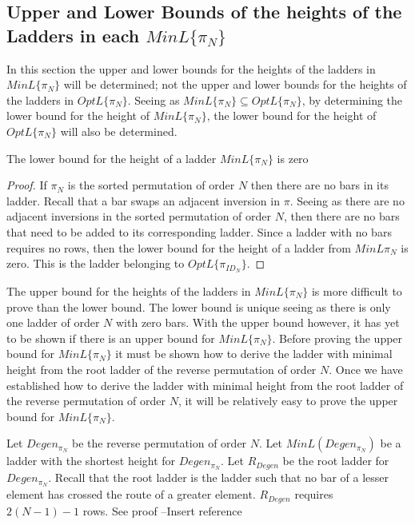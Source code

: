 \subsection{Upper and Lower Bounds of the heights of the Ladders in each $MinL\{\pi_{N}\}$}
In this section the upper and lower bounds for the heights of the ladders in $MinL\{\pi_{N}\}$ will be determined;
not the upper and lower bounds for the heights of the ladders in $OptL\{\pi_{N}\}$. Seeing as $MinL\{\pi_{N}\}\subseteq OptL\{\pi_{N}\}$, 
by determining the lower bound for the height of $MinL\{\pi_{N}\}$, the lower bound for the height of $OptL\{\pi_{N}\}$ will also be determined. 
\begin{lemma}
    The lower bound for the height of a ladder $MinL\{\pi_{N}\}$ is zero
\end{lemma} 
\begin{proof}
    If $\pi_{N}$ is the sorted permutation of order $N$ then there are no 
    bars in its ladder. Recall that a bar swaps an adjacent inversion in $\pi$.
    Seeing as there are no adjacent inversions in the sorted permutation of 
    order $N$, then there are no bars that need to be added to its corresponding 
    ladder. Since a ladder with no bars requires no rows, then the lower 
    bound for the height of a ladder from $MinL{\pi_{N}}$ is zero. This is 
    the ladder belonging to $OptL\{\pi_{ID_{N}}\}$.
\end{proof}\par 
The upper bound for the heights of the ladders in $MinL\{\pi_{N}\}$ is more difficult to prove than the lower bound. 
The lower bound is unique seeing as there is only one ladder of order $N$ with zero bars. 
With the upper bound however, it has yet to be shown if there is an upper bound for 
$MinL\{\pi_{N}\}$. Before proving the upper bound for $MinL\{\pi_{N}\}$ it must be shown how to 
derive the ladder with minimal height from the root ladder of the reverse permutation of order $N$.
Once we have established how to derive the ladder with minimal height from the root ladder 
of the reverse permutation of order $N$, it will be relatively easy to prove the upper bound 
for $MinL\{\pi_{N}\}$.\par 
 Let $Degen_{\pi_{N}}$ be the reverse permutation of order 
 $N$. Let $MinL(Degen_{\pi_{N}})$ be a ladder with the shortest height for $Degen_{\pi_{N}}$.
 Let $R_{Degen}$ be the root ladder for $Degen_{\pi_{N}}$. Recall that the root ladder is the ladder such 
    that no bar of a lesser element has crossed the route of a greater element. $R_{Degen}$ requires 
    $2(N-1)-1$ rows. See proof --Insert reference\par 
   
